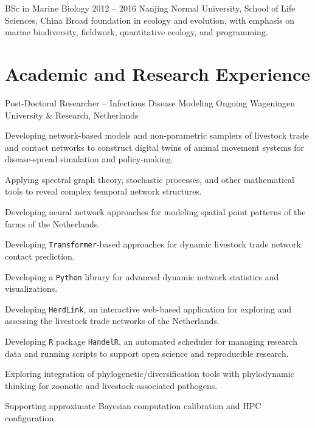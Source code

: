 \cventry
  {BSc in Marine Biology}
  {2012 -- 2016}
  {Nanjing Normal University, School of Life Sciences, China}
  {%
    Broad foundation in ecology and evolution, with emphasis on marine biodiversity, fieldwork, quantitative ecology, and programming.
  }
  
\section*{Academic and Research Experience}

\cventry
  {Post-Doctoral Researcher  -- Infectious Disease Modeling}
  {Ongoing}
  {Wageningen University \& Research, Netherlands}
  {%
   \begin{expitem}
     \item Developing network-based models and non-parametric samplers of livestock trade and contact networks to construct digital twins of animal movement systems for disease-spread simulation and policy-making.
     \item Applying spectral graph theory, stochastic processes, and other mathematical tools to reveal complex temporal network structures.
     \item Developing neural network approaches for modeling spatial point patterns of the farms of the Netherlands.
     \item Developing \texttt{Transformer}-based approaches for dynamic livestock trade network contact prediction.
     \item Developing a \texttt{Python} library for advanced dynamic network statistics and visualizations.
     \item Developing \texttt{HerdLink}, an interactive web-based application for exploring and assessing the livestock trade networks of the Netherlands.
     \item Developing \texttt{R} package \texttt{HandelR}, an automated scheduler for managing research data and running scripts to support open science and reproducible research.
     \item Exploring integration of phylogenetic/diversification tools with phylodynamic thinking for zoonotic and livestock-associated pathogens.
     \item Supporting approximate Bayesian computation calibration and HPC configuration.
   \end{expitem}
  }

